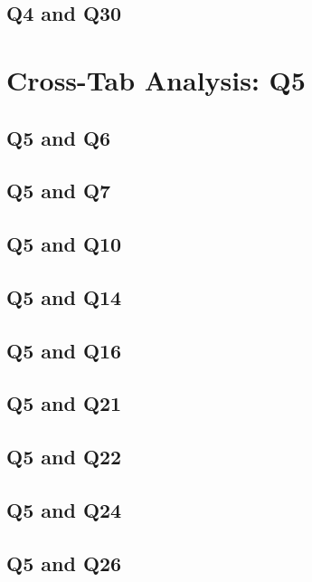 \documentclass{report}
\begin{document}
\clearpage
\section{Q4 and Q30}


\chapter{Cross-Tab Analysis: Q5}
\section{Q5 and Q6}


\clearpage
\section{Q5 and Q7}


\clearpage
\section{Q5 and Q10}


\clearpage
\section{Q5 and Q14}


\clearpage
\section{Q5 and Q16}


\clearpage
\section{Q5 and Q21}


\clearpage
\section{Q5 and Q22}


\clearpage
\section{Q5 and Q24}


\clearpage
\section{Q5 and Q26}

\end{document}

